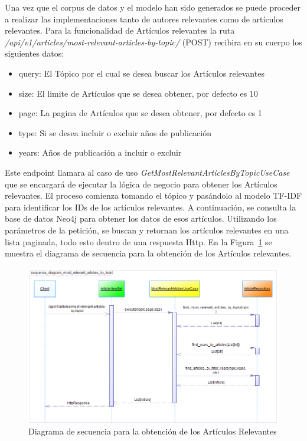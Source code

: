 Una vez que el corpus de datos y el modelo han sido generados se puede proceder a realizar las implementaciones tanto de autores relevantes como de artículos relevantes.
Para la funcionalidad de Artículos relevantes la ruta \textit{/api/v1/articles/most-relevant-articles-by-topic/} (POST) recibira en su cuerpo los siguientes datos:
\begin{itemize}
    \item query: El Tópico por el cual se desea buscar los Artículos relevantes
    \item size: El limite de Artículos que se desea obtener, por defecto es 10
    \item page: La pagina de Artículos que se desea obtener, por defecto es 1
    \item type: Si se desea incluir o excluir años de publicación
    \item years: Años de publicación a incluir o excluir
\end{itemize}
Este endpoint llamara al caso de uso \textit{GetMostRelevantArticlesByTopicUseCase} que se encargará de ejecutar la lógica de negocio para obtener los Artículos relevantes.
El proceso comienza tomando el tópico y pasándolo al modelo TF-IDF para identificar los IDs de los artículos relevantes. A continuación, se consulta la base de datos Neo4j para obtener los datos de esos artículos. Utilizando los parámetros de la petición, se buscan y retornan los artículos relevantes en una lista paginada, todo esto dentro de una respuesta Http.
En la Figura~\ref{fig:sequence-diagram-get-most-relevant-articles} se muestra el diagrama de secuencia para la obtención de los Artículos relevantes.

\begin{figure}[H]
    \centering
\includegraphics[scale=0.7]{../02Figures/02Chapter/Sprints/Sprint-4/sequence_diagram_most_relevant_articles_by_topic.png}
    \caption{Diagrama de secuencia para la obtención de los Artículos Relevantes}\label{fig:sequence-diagram-get-most-relevant-articles}
\end{figure}

